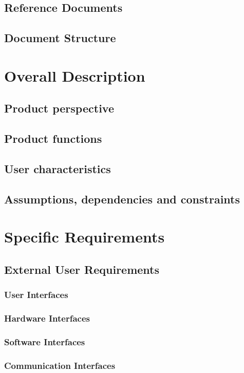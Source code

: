 \documentclass[12pt]{article}
\begin{document}
    \subsection{Reference Documents}
    \subsection{Document Structure}
    
\newpage
\section{Overall Description}
    \subsection{Product perspective}
        
    \subsection{Product functions}
    \subsection{User characteristics}
    \subsection{Assumptions, dependencies and constraints}
    
\newpage
\section{Specific Requirements}
    \subsection{External User Requirements}
        \subsubsection{User Interfaces}
        \subsubsection{Hardware Interfaces}
        \subsubsection{Software Interfaces}
        \subsubsection{Communication Interfaces}
\end{document}

